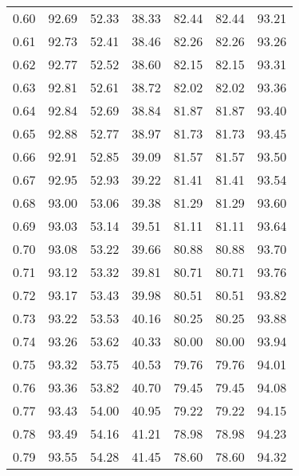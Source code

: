 \begin{tabular}{|c|c|c|c|c|c|c|}
      0.60 &     92.69 &     52.33 &      38.33 &   82.44 &      82.44 &         93.21 \\
      0.61 &     92.73 &     52.41 &      38.46 &   82.26 &      82.26 &         93.26 \\
      0.62 &     92.77 &     52.52 &      38.60 &   82.15 &      82.15 &         93.31 \\
      0.63 &     92.81 &     52.61 &      38.72 &   82.02 &      82.02 &         93.36 \\
      0.64 &     92.84 &     52.69 &      38.84 &   81.87 &      81.87 &         93.40 \\
      0.65 &     92.88 &     52.77 &      38.97 &   81.73 &      81.73 &         93.45 \\
      0.66 &     92.91 &     52.85 &      39.09 &   81.57 &      81.57 &         93.50 \\
      0.67 &     92.95 &     52.93 &      39.22 &   81.41 &      81.41 &         93.54 \\
      0.68 &     93.00 &     53.06 &      39.38 &   81.29 &      81.29 &         93.60 \\
      0.69 &     93.03 &     53.14 &      39.51 &   81.11 &      81.11 &         93.64 \\
      0.70 &     93.08 &     53.22 &      39.66 &   80.88 &      80.88 &         93.70 \\
      0.71 &     93.12 &     53.32 &      39.81 &   80.71 &      80.71 &         93.76 \\
      0.72 &     93.17 &     53.43 &      39.98 &   80.51 &      80.51 &         93.82 \\
      0.73 &     93.22 &     53.53 &      40.16 &   80.25 &      80.25 &         93.88 \\
      0.74 &     93.26 &     53.62 &      40.33 &   80.00 &      80.00 &         93.94 \\
      0.75 &     93.32 &     53.75 &      40.53 &   79.76 &      79.76 &         94.01 \\
      0.76 &     93.36 &     53.82 &      40.70 &   79.45 &      79.45 &         94.08 \\
      0.77 &     93.43 &     54.00 &      40.95 &   79.22 &      79.22 &         94.15 \\
      0.78 &     93.49 &     54.16 &      41.21 &   78.98 &      78.98 &         94.23 \\
      0.79 &     93.55 &     54.28 &      41.45 &   78.60 &      78.60 &         94.32 \\

\end{tabular}
